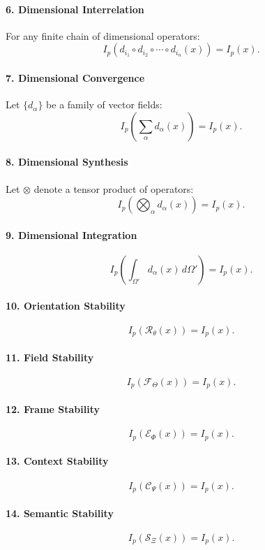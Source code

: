 \paragraph{6. Dimensional Interrelation}
For any finite chain of dimensional operators:
\[
I_p(d_{i_1} \circ d_{i_2} \circ \cdots \circ d_{i_n}(x)) = I_p(x).
\]

\paragraph{7. Dimensional Convergence}
Let $\{d_{\alpha}\}$ be a family of vector fields:
\[
I_p\left(\sum_{\alpha} d_{\alpha}(x)\right) = I_p(x).
\]

\paragraph{8. Dimensional Synthesis}
Let $\otimes$ denote a tensor product of operators:
\[
I_p\left(\bigotimes_{\alpha} d_{\alpha}(x)\right) = I_p(x).
\]

\paragraph{9. Dimensional Integration}
\[
I_p\left(\int_{\Omega'} d_{\alpha}(x)\, d\Omega'\right) = I_p(x).
\]

\paragraph{10. Orientation Stability}
\[
I_p(\mathcal{R}_{\theta}(x)) = I_p(x).
\]

\paragraph{11. Field Stability}
\[
I_p(\mathcal{F}_{\Theta}(x)) = I_p(x).
\]

\paragraph{12. Frame Stability}
\[
I_p(\mathcal{E}_{\Phi}(x)) = I_p(x).
\]

\paragraph{13. Context Stability}
\[
I_p(\mathcal{C}_{\Psi}(x)) = I_p(x).
\]

\paragraph{14. Semantic Stability}
\[
I_p(\mathcal{S}_{\Xi}(x)) = I_p(x).
\]

